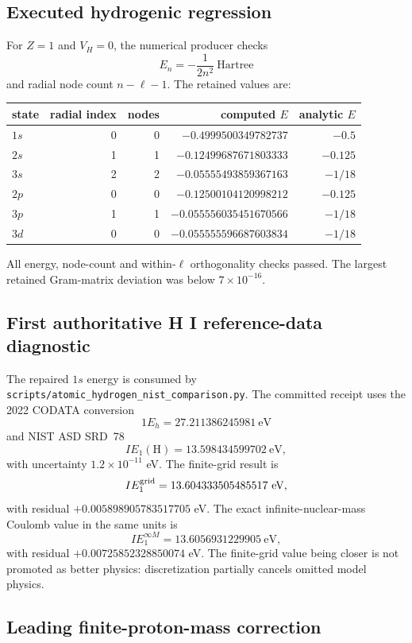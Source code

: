 \subsection{Executed hydrogenic regression}

For $Z=1$ and $V_H=0$, the numerical producer checks
\[
  E_n=-\frac{1}{2n^2}\ \text{Hartree}
\]
and radial node count $n-\ell-1$. The retained values are:

\begin{center}
\begin{tabular}{lrrrr}
\toprule
state & radial index & nodes & computed $E$ & analytic $E$\\
\midrule
$1s$ & 0 & 0 & $-0.4999500349782737$ & $-0.5$\\
$2s$ & 1 & 1 & $-0.12499687671803333$ & $-0.125$\\
$3s$ & 2 & 2 & $-0.05555493859367163$ & $-1/18$\\
$2p$ & 0 & 0 & $-0.12500104120998212$ & $-0.125$\\
$3p$ & 1 & 1 & $-0.055556035451670566$ & $-1/18$\\
$3d$ & 0 & 0 & $-0.055555596687603834$ & $-1/18$\\
\bottomrule
\end{tabular}
\end{center}

All energy, node-count and within-$\ell$ orthogonality checks passed. The
largest retained Gram-matrix deviation was below $7\times10^{-16}$.

\subsection{First authoritative H I reference-data diagnostic}

The repaired $1s$ energy is consumed by
\texttt{scripts/atomic\_hydrogen\_nist\_comparison.py}. The committed receipt
uses the 2022 CODATA conversion
\[
  1E_h=27.211386245981\ \mathrm{eV}
\]
and NIST ASD SRD~78
\[
  IE_1(\mathrm H)=13.598434599702\ \mathrm{eV},
\]
with uncertainty $1.2\times10^{-11}$ eV. The finite-grid result is
\[
  IE_1^{\rm grid}=13.604333505485517\ \mathrm{eV},
\]
with residual $+0.005898905783517705$ eV. The exact infinite-nuclear-mass
Coulomb value in the same units is
\[
  IE_1^{\infty M}=13.6056931229905\ \mathrm{eV},
\]
with residual $+0.00725852328850074$ eV. The finite-grid value being closer is
not promoted as better physics: discretization partially cancels omitted model
physics.

\subsection{Leading finite-proton-mass correction}

